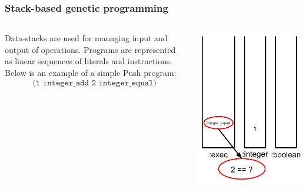 \documentclass{beamer}
\newcommand{\linespace}{\vskip 0.25cm}
\begin{document}
\begin{frame}
	\frametitle{Stack-based genetic programming}
	\begin{columns}
		\begin{column}{0.65\textwidth}
			Data-stacks are used for managing input and output of operations.
			\linespace
			\linespace
			\linespace
			Programs are represented as linear sequences of literals and instructions. Below is an example of a simple Push program:
			\[\texttt{(1 integer\_add 2 integer\_equal)}\]
		\end{column}
		\begin{column}{0.35\textwidth}
			\includegraphics[height=.7\textheight]{Illustrations/stack_7.PDF}
		\end{column}
	\end{columns}
\end{frame}
\end{document}
